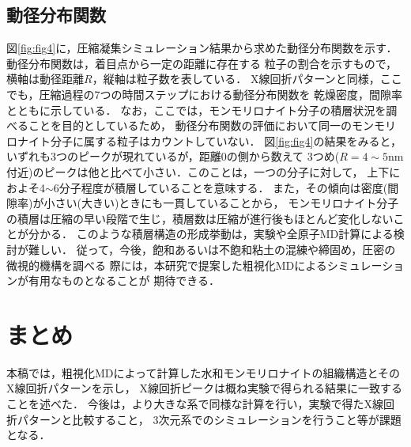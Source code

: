 ﻿\documentclass[11pt,a4j]{jarticle}
\begin{document}
\subsection{動径分布関数}
図\ref{fig:fig4}に，圧縮凝集シミュレーション結果から求めた動径分布関数を示す．
動径分布関数は，着目点から一定の距離に存在する
粒子の割合を示すもので，横軸は動径距離$R$，縦軸は粒子数を表している．
X線回折パターンと同様，ここでも，圧縮過程の7つの時間ステップにおける動径分布関数を
乾燥密度，間隙率とともに示している．
なお，ここでは，モンモリロナイト分子の積層状況を調べることを目的としているため，
動径分布関数の評価において同一のモンモリロナイト分子に属する粒子はカウントしていない．
図\ref{fig:fig4}の結果をみると，いずれも3つのピークが現れているが，距離0の側から数えて
3つめ($R=4\sim 5$nm付近)のピークは他と比べて小さい．このことは，一つの分子に対して，
上下におよそ4$\sim$6分子程度が積層していることを意味する．
また，その傾向は密度(間隙率)が小さい(大きい)ときにも一貫していることから，
モンモリロナイト分子の積層は圧縮の早い段階で生じ，積層数は圧縮が進行後もほとんど変化しないことが分かる．
このような積層構造の形成挙動は，実験や全原子MD計算による検討が難しい．
従って，今後，飽和あるいは不飽和粘土の混練や締固め，圧密の微視的機構を調べる
際には，本研究で提案した粗視化MDによるシミュレーションが有用なものとなることが
期待できる．
\vspace{-5mm}
\section{まとめ}
本稿では，粗視化MDによって計算した水和モンモリロナイトの組織構造とそのX線回折パターンを示し，
X線回折ピークは概ね実験で得られる結果に一致することを述べた．
今後は，より大きな系で同様な計算を行い，実験で得たX線回折パターンと比較すること，
3次元系でのシミュレーションを行うこと等が課題となる．
\end{document}
